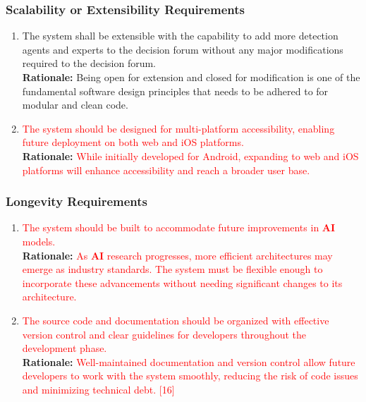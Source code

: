 \documentclass{article}
\begin{document}
\subsubsection{Scalability or Extensibility Requirements}
\label{ssub:scalability_or_extensibility_requirements}
\begin{enumerate}[{PR-SE}1. ]
	\item The system shall be extensible with the capability to add more detection agents and experts to the decision forum without any major modifications required to the decision forum.\\
	\textbf{Rationale:} Being open for extension and closed for modification is one of the fundamental software design principles that needs to be adhered to for modular and clean code. 
	\item \textcolor{red}{The system should be designed for multi-platform accessibility, enabling future deployment on both web and iOS platforms.}\\
	\textbf{Rationale:} \textcolor{red}{While initially developed for Android, expanding to web and iOS platforms will enhance accessibility and reach a broader user base.}\\
\end{enumerate}

\subsubsection{Longevity Requirements}
\label{ssub:longevity_requirements}
\begin{enumerate}[{PR-L}1. ]
	\item \textcolor{red}{The system should be built to accommodate future improvements in \textbf{AI} models.}\\
	\textbf{Rationale:} \textcolor{red}{As \textbf{AI} research progresses, more efficient architectures may emerge as industry standards. The system must be flexible enough to incorporate these advancements without needing significant changes to its architecture.}
	\item \textcolor{red}{The source code and documentation should be organized with effective version control and clear guidelines for developers throughout the development phase.}\\
	\textbf{Rationale:} \textcolor{red}{Well-maintained documentation and version control allow future developers to work with the system smoothly, reducing the risk of code issues and minimizing technical debt. [16]}\\
\end{enumerate}
\end{document}

